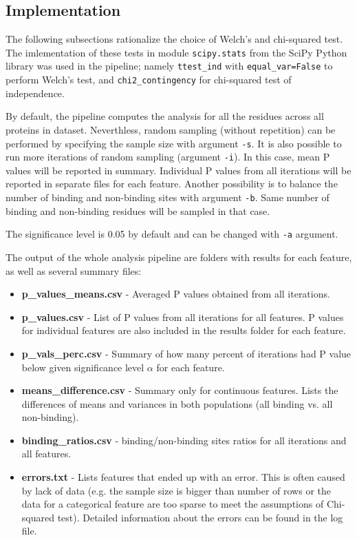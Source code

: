\subsection{Implementation}

The following subsections rationalize the choice of Welch's and chi-squared test. The imlementation of these tests in module \texttt{scipy.stats} from the SciPy Python library \cite{scipy} was used in the pipeline; namely \texttt{ttest\_ind} with \texttt{equal\_var=False} to perform Welch's test, and \texttt{chi2\_contingency} for chi-squared test of independence.

By default, the pipeline computes the analysis for all the residues across all proteins in dataset. Neverthless, random sampling (without repetition) can be performed by specifying the sample size with argument \texttt{-s}. It is also possible to run more iterations of random sampling (argument \texttt{-i}). In this case, mean P values will be reported in summary. Individual P values from all iterations will be reported in separate files for each feature. Another possibility is to balance the number of binding and non-binding sites with argument \texttt{-b}. Same number of binding and non-binding residues will be sampled in that case.

The significance level is 0.05 by default and can be changed with \texttt{-a} argument.

The output of the whole analysis pipeline are folders with results for each feature, as well as several summary files:

\begin{itemize}
\item \textbf{p\_values\_means.csv} - Averaged P values obtained from all iterations.
\item \textbf{p\_values.csv} - List of P values from all iterations for all features. P values for individual features are also included in the results folder for each feature.
\item \textbf{p\_vals\_perc.csv} - Summary of how many percent of iterations had P value below given significance level $\alpha$ for each feature.
\item \textbf{means\_difference.csv} - Summary only for continuous features. Lists the differences of means and variances in both populations (all binding vs. all non-binding).
\item \textbf{binding\_ratios.csv} - binding/non-binding sites ratios for all iterations and all features.
\item \textbf{errors.txt} - Lists features that ended up with an error. This is often caused by lack of data (e.g. the sample size is bigger than number of rows or the data for a categorical feature are too sparse to meet the assumptions of Chi-squared test). Detailed information about the errors can be found in the log file.
\end{itemize}

